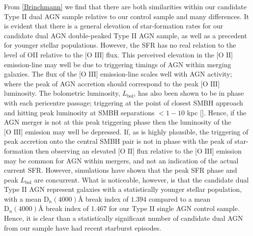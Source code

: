 From \ref{Brinchmann} we find that there are both similarities within our candidate Type II dual AGN sample relative to our control sample and many differences. It is evident that there is a general elevation of star-formation rates for our candidate dual AGN double-peaked Type II AGN sample, as well as a precedent for younger stellar populations. However, the SFR has no real relation to the level of OII relative to the $\text{[O III]}$ flux. This perceived elevation in the $\text{[O II]}$ emission-line may well be due to triggering timings of AGN within merging galaxies. The flux of the $\text{[O III]}$ emission-line scales well with AGN activity; where the peak of AGN accretion should correspond to the peak $\text{[O III]}$ luminosity. The bolometric luminosity, $L_{\text{bol}}$, has also been shown to be in phase with each pericentre passage; triggering at the point of closest SMBH approach and hitting peak luminosity at SMBH separations $<{1-10}$ kpc [\cite{Van_Wassenhove_2012}]. Hence, if the AGN merger is not at this peak triggering phase then the luminosity of the $\text{[O III]}$ emission may well be depressed. If, as is highly plausible, the triggering of peak accretion onto the central SMBH pair is not in phase with the peak of star-formation then observing an elevated $\text{[O II]}$ flux relative to the $\text{[O III]}$ emission may be common for AGN within mergers, and not an indication of the actual current SFR. However, simulations have shown that the peak SFR phase and peak $L_{\text{bol}}$ are concurrent. What is noticeable, however, is that the candidate dual Type II AGN represent galaxies with a statistically younger stellar population, with a mean $\text{D}_{n}(4000)Å$ break index of $1.394$ compared to a mean $\text{D}_{n}(4000)Å$ break index of $1.467$ for our Type II single AGN control sample. Hence, it is clear than a statistically significant number of candidate dual AGN from our sample have had recent starburst episodes.      

